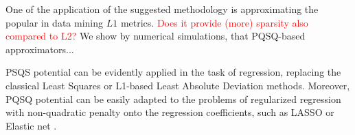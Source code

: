 \documentclass[preprint,12pt]{elsarticle}
\newcommand\myworries[1]{\textcolor{red}{#1}}
\begin{document}
One of the application of the suggested methodology is approximating the popular in data mining $L1$ metrics. \myworries{ Does it provide (more) sparsity also compared to L2?} We show by numerical simulations, that PQSQ-based approximators...

PSQS potential can be evidently applied in the task of regression, replacing the classical Least Squares or L1-based Least Absolute Deviation methods. Moreover, PQSQ potential can be easily adapted to the problems of regularized regression with non-quadratic penalty onto the regression coefficients, such as LASSO \cite{} or Elastic net \cite{}.









\end{document}
